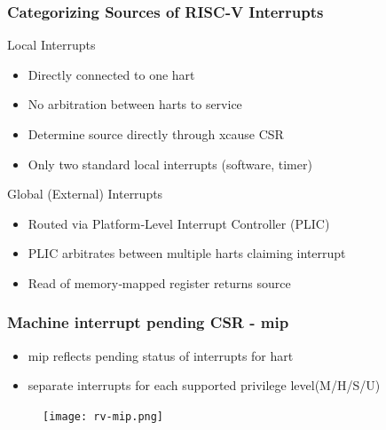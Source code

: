\begin{frame}[fragile]
    \frametitle{Categorizing	
 Sources	
 of	
 RISC‐V	
 Interrupts	
 }
Local	
 Interrupts	
  
    \begin{itemize}
    \item  Directly	connected	 to	 one	 hart	
    \item  No	 arbitration	 between	 harts	 to	 service	
    \item Determine	
 source	
 directly	
 through	
 xcause	
 CSR	
  
    \item  Only	 two	 standard	 local	 interrupts	 (software,	 timer)	
      
\end{itemize}
Global	
 (External)	
 Interrupts	
  
    \begin{itemize}
    \item  Routed	 via	 Platform‐Level	 Interrupt	 Controller	 (PLIC)	
    \item  PLIC	 arbitrates	 between	 multiple	 harts	 claiming	 interrupt	
    \item Read	 of	 memory‐mapped	 register	 returns	 source    
\end{itemize}
\end{frame}
% 
% 
\begin{frame}[fragile]
    \frametitle{Machine interrupt pending CSR - mip}
    \begin{itemize}
    \item  mip reflects pending status of interrupts for hart
    \item  separate interrupts for each supported privilege level(M/H/S/U)	  
\end{itemize}
    \begin{figure}
    \texttt{[image: rv-mip.png]}
    \end{figure}
\end{frame}
% 
% 
